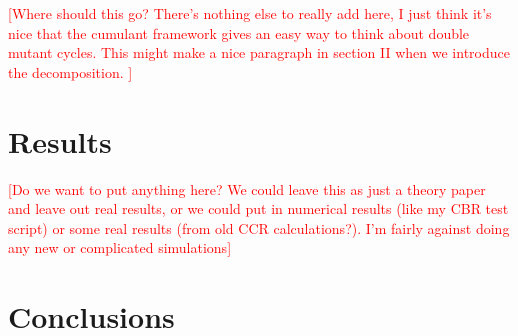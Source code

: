 \documentclass[%
 preprint,
 amsmath,amssymb,
 aps,
]{revtex4-1}
\newcommand{\warning}[1]{{\textsf{{\textcolor{red}{{[#1]}{}}}}}}
\begin{document}
\warning{Where should this go?  There's nothing else to really add here, I just think it's nice that the cumulant framework gives an easy way to think about double mutant cycles.  This might make a nice paragraph in section II when we introduce the decomposition.  }


\section{Results}
\warning{Do we want to put anything here?  We could leave this as just a theory paper and leave out real results, or we could put in numerical results (like my CBR test script) or some real results (from old CCR calculations?).  I'm fairly against doing any new or complicated simulations}

\section{Conclusions}
 
 
\clearpage



\end{document}
